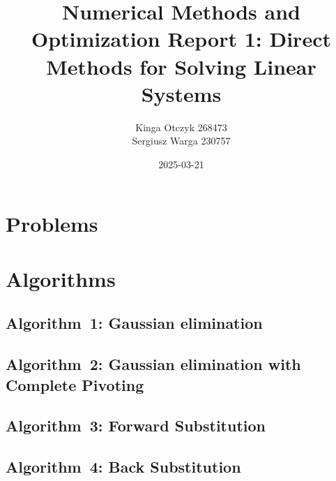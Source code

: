 \documentclass[a4paper]{article}
\title{Numerical Methods and Optimization Report 1:
  Direct Methods for Solving Linear Systems}
\author{Kinga Otczyk 268473\\Sergiusz Warga 230757}
\date{2025-03-21}
\begin{document}
\maketitle
\tableofcontents
\pagebreak

\section{Problems}







% 

\clearpage

\section{Algorithms}
\subsection{Algorithm~1: Gaussian elimination}%
\label{algorithm:1}

\subsection{Algorithm~2: Gaussian  elimination  with  Complete  Pivoting}%
\label{algorithm:2}

\subsection{Algorithm~3: Forward Substitution}%
\label{algorithm:3}

\subsection{Algorithm~4: Back Substitution}%
\label{algorithm:4}

\end{document}
